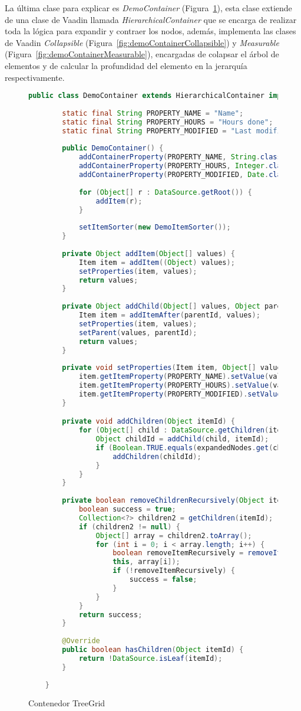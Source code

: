 La última clase para explicar es \emph{DemoContainer}  (Figura~\ref{fig:demoContainer}), esta clase extiende de una clase de Vaadin llamada \emph{HierarchicalContainer} que se encarga de realizar toda la lógica para expandir y contraer los nodos, además, implementa las clases de Vaadin \emph{Collapsible} (Figura~\ref{fig:demoContainerCollapsible}) y \emph{Measurable} (Figura~\ref{fig:demoContainerMeasurable}), encargadas de colapsar el árbol de elementos y de calcular la profundidad del elemento en la jerarquía respectivamente.




\begin{figure}[!tb]
	\centering
	\begin{lstlisting}[language=Java]
	public class DemoContainer extends HierarchicalContainer implements Collapsible, Measurable {
	
		static final String PROPERTY_NAME = "Name";
		static final String PROPERTY_HOURS = "Hours done";
		static final String PROPERTY_MODIFIED = "Last modified";
		
		public DemoContainer() {
			addContainerProperty(PROPERTY_NAME, String.class, "");
			addContainerProperty(PROPERTY_HOURS, Integer.class, 0);
			addContainerProperty(PROPERTY_MODIFIED, Date.class, new Date());
			
			for (Object[] r : DataSource.getRoot()) {
				addItem(r);
			}
			
			setItemSorter(new DemoItemSorter());
		}
		
		private Object addItem(Object[] values) {
			Item item = addItem((Object) values);
			setProperties(item, values);
			return values;
		}
		
		private Object addChild(Object[] values, Object parentId) {
			Item item = addItemAfter(parentId, values);
			setProperties(item, values);
			setParent(values, parentId);
			return values;
		}
		
		private void setProperties(Item item, Object[] values) {
			item.getItemProperty(PROPERTY_NAME).setValue(values[0]);
			item.getItemProperty(PROPERTY_HOURS).setValue(values[1]);
			item.getItemProperty(PROPERTY_MODIFIED).setValue(values[2]);
		}

		private void addChildren(Object itemId) {
			for (Object[] child : DataSource.getChildren(itemId)) {
				Object childId = addChild(child, itemId);
				if (Boolean.TRUE.equals(expandedNodes.get(childId))) {
					addChildren(childId);
				}
			}
		}
		
		private boolean removeChildrenRecursively(Object itemId) {
			boolean success = true;
			Collection<?> children2 = getChildren(itemId);
			if (children2 != null) {
				Object[] array = children2.toArray();
				for (int i = 0; i < array.length; i++) {
					boolean removeItemRecursively = removeItemRecursively(
					this, array[i]);
					if (!removeItemRecursively) {
						success = false;
					}
				}
			}
			return success;	
		}
		
		@Override
		public boolean hasChildren(Object itemId) {
			return !DataSource.isLeaf(itemId);
		}
		
	}
	\end{lstlisting}
	\caption{Contenedor TreeGrid}
	\label{fig:demoContainer}
\end{figure}


